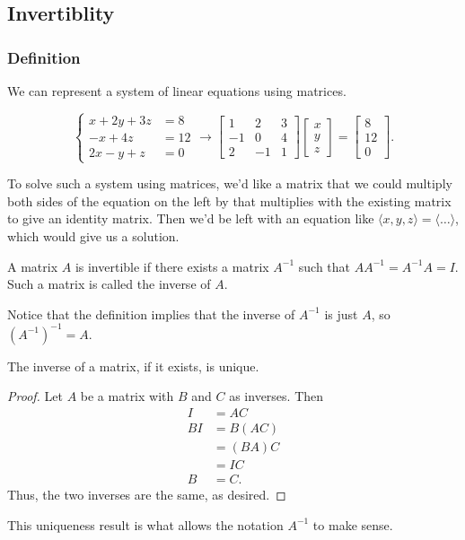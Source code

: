\subsection{Invertiblity}

\subsubsection{Definition}
We can represent a system of linear equations using matrices.

\begin{example}
	\begin{equation*}
		\begin{cases}
			x  + 2y + 3z &= 8  \\
			-x      + 4z &= 12 \\
			2x - y  +  z &= 0 
		\end{cases} \rightarrow
		\begin{bmatrix}
			1  & 2  & 3 \\
			-1 & 0  & 4 \\
			2  & -1 & 1 
		\end{bmatrix}\begin{bmatrix}
			x \\ y \\ z
		\end{bmatrix} = \begin{bmatrix}
			8 \\ 12 \\ 0
		\end{bmatrix}.
	\end{equation*}
\end{example}

To solve such a system using matrices, we'd like a matrix that we could multiply both sides of the equation on the left by that multiplies with the existing matrix to give an identity matrix.
Then we'd be left with an equation like $\langle x, y, z \rangle = \langle \dots \rangle$, which would give us a solution.

\begin{definition}
	A matrix $A$ is invertible if there exists a matrix $A^{-1}$ such that $AA^{-1} = A^{-1}A = I$.
	Such a matrix is called the inverse of $A$.
\end{definition}
Notice that the definition implies that the inverse of $A^{-1}$ is just $A$, so $(A^{-1})^{-1} = A$.

\begin{theorem}
	The inverse of a matrix, if it exists, is unique.
\end{theorem}
\begin{proof}
	Let $A$ be a matrix with $B$ and $C$ as inverses.
	Then
	\begin{align*}
		I &= AC \\
		BI &= B(AC) \\
		&= (BA)C \\
		&= IC \\
		B &= C.
	\end{align*}
	Thus, the two inverses are the same, as desired.
\end{proof}
This uniqueness result is what allows the notation $A^{-1}$ to make sense.

